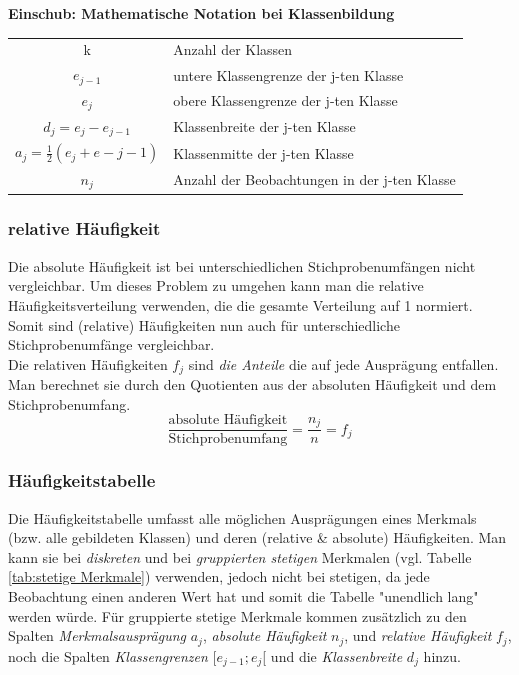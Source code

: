 \documentclass[a4paper]{article}
\begin{document}
\clearpage

\noindent \textbf{Einschub: Mathematische Notation bei Klassenbildung}\\
\begin{center}
    \begin{tabular}{cl}
         k & Anzahl der Klassen\\
$e_{j-1}$&untere Klassengrenze der j-ten Klasse\\
$e_j$&obere Klassengrenze der j-ten Klasse\\
$d_j=e_j-e_{j-1}$& Klassenbreite der j-ten Klasse\\
$a_j=\frac{1}{2}(e_j+e-{j-1})$& Klassenmitte der j-ten Klasse\\
$n_j$ &Anzahl der Beobachtungen in der j-ten Klasse\\
    \end{tabular}
\end{center}

\subsubsection{relative Häufigkeit}\label{sec:rel-hkeit}
Die absolute Häufigkeit ist bei unterschiedlichen Stichprobenumfängen nicht vergleichbar.
Um dieses Problem zu umgehen kann man die relative Häufigkeitsverteilung verwenden, die die gesamte Verteilung auf 1 normiert. Somit sind (relative) Häufigkeiten nun auch für unterschiedliche Stichprobenumfänge vergleichbar.\\
Die relativen Häufigkeiten $f_j$ sind \textit{die Anteile} die auf jede Ausprägung entfallen. Man berechnet sie durch den Quotienten aus der absoluten Häufigkeit und dem Stichprobenumfang.
$$\frac {\mbox {absolute Häufigkeit}}{\mbox{Stichprobenumfang}} = \frac{n_j}{n}=f_j$$

\subsubsection{Häufigkeitstabelle}
Die Häufigkeitstabelle umfasst alle möglichen Ausprägungen eines Merkmals (bzw. alle gebildeten Klassen) und deren (relative \& absolute) Häufigkeiten.
Man kann sie bei \textit{diskreten} und bei \textit{gruppierten stetigen} Merkmalen (vgl. Tabelle \ref{tab:stetige Merkmale}) verwenden, jedoch nicht bei stetigen, da jede Beobachtung einen anderen Wert hat und somit die Tabelle "unendlich lang" werden würde. Für gruppierte stetige Merkmale kommen zusätzlich zu den Spalten \textit{Merkmalsausprägung} $a_j$, \textit{absolute Häufigkeit} $n_j$, und \textit{relative Häufigkeit} $f_j$, noch die Spalten \textit{Klassengrenzen} [$e_{j-1};e_j$[ und die \textit{Klassenbreite} $d_j$ hinzu.
\end{document}
